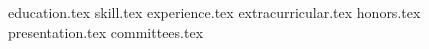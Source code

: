 \documentclass[11pt, a4paper]{awesome-cv}
\newcommand*{\sectiondir}{resume/}
\begin{document}
\makecvheader

{education.tex}
{skill.tex}
{experience.tex}
{extracurricular.tex}
{honors.tex}
{presentation.tex}
{committees.tex}
\end{document}
